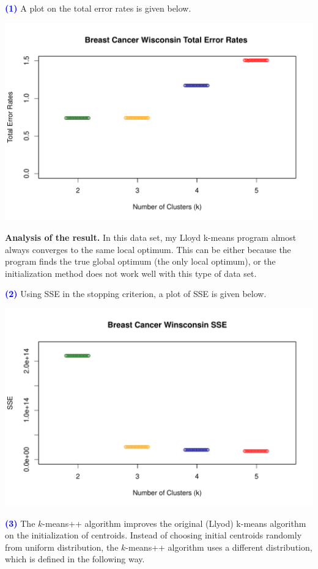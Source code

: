 \documentclass[a4paper,11pt]{article}
\newcommand{\qnum}[1]{\noindent\textcolor{blue}{\textbf{(#1)}}}
\begin{document}
\qnum{1}
A plot on the total error rates is given below.
\begin{center}
  \includegraphics[width=0.9\linewidth]{Image/ProbEC1.pdf}
\end{center}

\textbf{Analysis of the result.}
In this data set, my Lloyd k-means program almost always converges to the same local optimum. This can be either because the program finds the true global optimum (the only local optimum), or the initialization method does not work well with this type of data set.
\bigskip


\qnum{2}
Using SSE in the stopping criterion, a plot of SSE is given below. 
\begin{center}
  \includegraphics[width=0.9\linewidth]{Image/ProbEC2.pdf}
\end{center}







\qnum{3}
The $k$-means++ algorithm improves the original (Llyod) k-means algorithm on the initialization of centroids. Instead of choosing initial centroids randomly from uniform distribution, the $k$-means++ algorithm uses a different distribution, which is defined in the following way.
\end{document}
